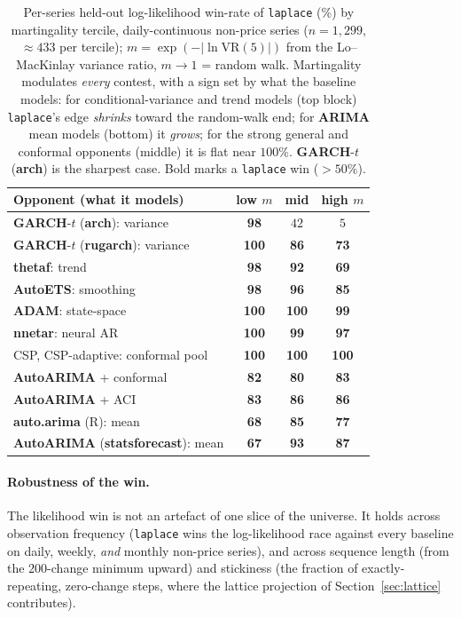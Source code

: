 \documentclass[article]{jss}
\providecommand{\proglang}[1]{\textsf{#1}}
\providecommand{\pkg}[1]{\textbf{#1}}
\providecommand{\code}[1]{\texttt{#1}}
\begin{document}
\begin{table}[t!]
\centering
\begin{tabular}{lccc}
\toprule
Opponent (what it models) & low $m$ & mid & high $m$ \\
\midrule
\pkg{GARCH}-$t$ (\pkg{arch}): variance    & \textbf{98} & $42$ & $5$ \\
\pkg{GARCH}-$t$ (\pkg{rugarch}): variance & \textbf{100} & \textbf{86} & \textbf{73} \\
\pkg{thetaf}: trend                        & \textbf{98} & \textbf{92} & \textbf{69} \\
\pkg{AutoETS}: smoothing                   & \textbf{98} & \textbf{96} & \textbf{85} \\
\midrule
\pkg{ADAM}: state-space                    & \textbf{100} & \textbf{100} & \textbf{99} \\
\pkg{nnetar}: neural AR                    & \textbf{100} & \textbf{99} & \textbf{97} \\
CSP, CSP-adaptive: conformal pool          & \textbf{100} & \textbf{100} & \textbf{100} \\
\pkg{AutoARIMA} + conformal                   & \textbf{82} & \textbf{80} & \textbf{83} \\
\pkg{AutoARIMA} + ACI                         & \textbf{83} & \textbf{86} & \textbf{86} \\
\midrule
\pkg{auto.arima} (\proglang{R}): mean      & \textbf{68} & \textbf{85} & \textbf{77} \\
\pkg{AutoARIMA} (\pkg{statsforecast}): mean & \textbf{67} & \textbf{93} & \textbf{87} \\
\bottomrule
\end{tabular}
\caption{Per-series held-out log-likelihood win-rate of \code{laplace} (\%) by
martingality tercile, daily-continuous non-price series ($n = 1{,}299$, $\approx
433$ per tercile); $m=\exp(-\lvert\ln\mathrm{VR}(5)\rvert)$ from the Lo--MacKinlay
variance ratio, $m\to1$ = random walk. Martingality modulates \emph{every}
contest, with a sign set by what the baseline models: for conditional-variance and
trend models (top block) \code{laplace}'s edge \emph{shrinks} toward the
random-walk end; for \pkg{ARIMA} mean models (bottom) it \emph{grows}; for the
strong general and conformal opponents (middle) it is flat near $100\%$.
\pkg{GARCH}-$t$ (\pkg{arch}) is the sharpest case. Bold marks a \code{laplace} win
($>50\%$).}
\label{tab:mart}
\end{table}

\paragraph{Robustness of the win.}
The likelihood win is not an artefact of one slice of the universe. It holds
across observation frequency (\code{laplace} wins the log-likelihood race
against every baseline on daily, weekly, \emph{and} monthly non-price series), and
across sequence length (from the $200$-change minimum upward) and stickiness (the
fraction of exactly-repeating, zero-change steps, where the lattice projection of
Section~\ref{sec:lattice} contributes).
\end{document}

